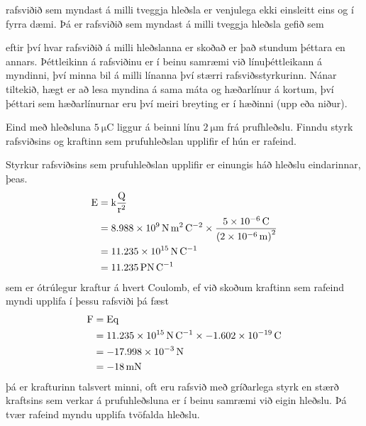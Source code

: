 rafsviðið sem myndast á milli tveggja hleðsla er venjulega
ekki einsleitt eins og í fyrra dæmi. Þá er rafsviðið sem myndast
á milli tveggja hleðsla gefið  sem
eftir því hvar rafsviðið á milli hleðslanna er skoðað er það stundum
þéttara en annars. Þéttleikinn á rafsviðinu er í beinu samræmi við
línuþéttleikann á myndinni, því minna bil á milli línanna því stærri
rafsviðsstyrkurinn. Nánar tiltekið, hægt er að lesa myndina á sama
máta og hæðarlínur á kortum, því þéttari sem hæðarlínurnar eru því
meiri breyting er í hæðinni (upp eða niður).
\begin{formalexample}
	Eind með hleðsluna $\SI{5}{\micro\coulomb}$ liggur á beinni línu
	$\SI{2}{\micro\m}$ frá prufhleðslu. Finndu styrk rafsviðsins
	og kraftinn sem prufuhleðslan upplifir ef hún er rafeind.
	\vspace{4 ex}
	
	\noindent Styrkur rafsviðsins sem prufuhleðslan upplifir er einungis háð
	hleðslu eindarinnar, þeas.
	\begin{align*}
	\uefielde
		&= \uconstk \frac{\uchargeQ}{\ulengthr^2} \\
		&= \ucoulombconstantenmc \times
			\frac{\SI{5e-6}{\coulomb}
				}{
				\left( \SI{2e-6}{\m} \right)^2
				} \\
		&= \SI{11.235e15}{\N\per\coulomb} \\
		&= \SI{11.235}{\peta\N\per\coulomb}
	\end{align*}
	sem er ótrúlegur kraftur á hvert Coulomb, ef við skoðum
	kraftinn sem rafeind myndi upplifa í þessu rafsviði þá fæst
	\begin{align*}
		\uforce &= \uefielde \uchargeq \\
			&= \SI{11.235e15}{\N\per\coulomb} \times \SI{-1.602e-19}{\coulomb} \\
			&= \SI{-17.998e-3}{\N} \\
			&= \SI{-18}{\mN}
	\end{align*}
	þá er krafturinn talsvert minni, oft eru rafsvið með gríðarlega styrk en
	stærð kraftsins sem verkar á prufuhleðsluna er í beinu samræmi við eigin
	hleðslu. Þá tvær rafeind myndu upplifa tvöfalda hleðslu.
\end{formalexample}
 

